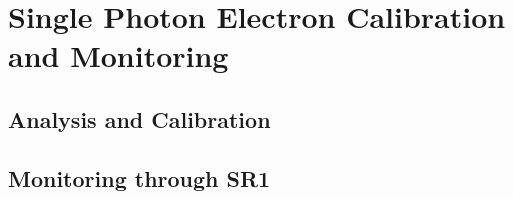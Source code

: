 \chapter{Single Photon Electron Calibration and Monitoring}
\label{chpt:SPhE}
\section{Analysis and Calibration}
\section{Monitoring through SR1}